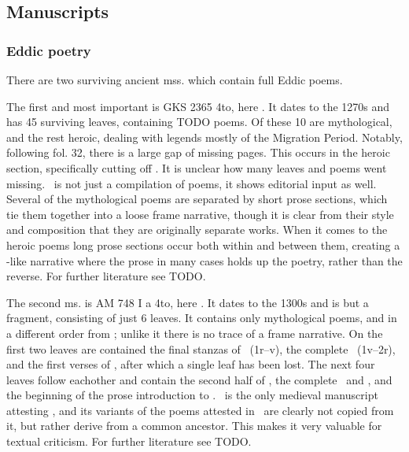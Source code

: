   \subsection{Manuscripts}

    \subsubsection{Eddic poetry}
    There are two surviving ancient mss. which contain full Eddic poems.

    The first and most important is GKS 2365 4to, here \Regius. It dates to the 1270s and has 45 surviving leaves, containing TODO poems. Of these 10 are mythological, and the rest heroic, dealing with legends mostly of the Migration Period. Notably, following fol. 32, there is a large gap of missing pages. This occurs in the heroic section, specifically cutting off \Sigrdrifumal. It is unclear how many leaves and poems went missing.
    \Regius\ is not just a compilation of poems, it shows editorial input as well. Several of the mythological poems are separated by short prose sections, which tie them together into a loose frame narrative, though it is clear from their style and composition that they are originally separate works. When it comes to the heroic poems long prose sections occur both within and between them, creating a -like narrative where the prose in many cases holds up the poetry, rather than the reverse. For further literature see TODO.

    The second ms. is AM 748 I a 4to, here \AM. It dates to the 1300s and is but a fragment, consisting of just 6 leaves. It contains only mythological poems, and in a different order from \Regius; unlike it there is no trace of a frame narrative. On the first two leaves are contained the final stanzas of \Harbardsljod\ (1r–v), the complete \Baldrsdraumar\ (1v–2r), and the first verses of \Skirnismal, after which a single leaf has been lost. The next four leaves follow eachother and contain the second half of \Vafthrudnismal, the complete \Grimnismal\ and \Hymiskvida, and the beginning of the prose introduction to \Volundarkvida. \AM\ is the only medieval manuscript attesting \Baldrsdraumar, and its variants of the poems attested in \Regius\ are clearly not copied from it, but rather derive from a common ancestor. This makes it very valuable for textual criticism. For further literature see TODO.

